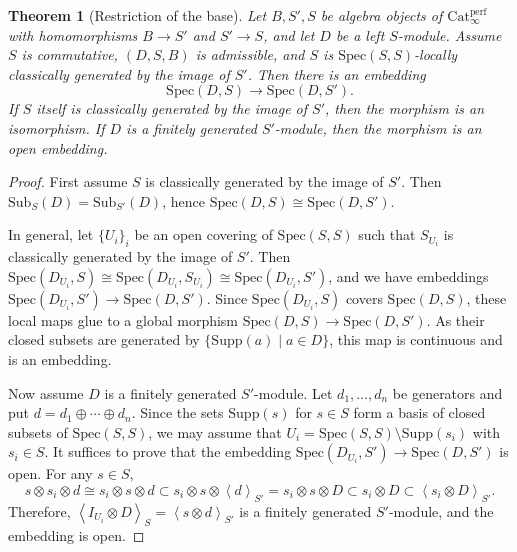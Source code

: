 \documentclass[11pt]{amsart}
\theoremstyle{definition}
\theoremstyle{plain}
\newtheorem{thm}[defn]{Theorem}
\theoremstyle{remark}
\newcommand{\Spec}{\mathrm{Spec}}
\newcommand{\Sub}{\mathrm{Sub}}
\newcommand{\Supp}{\mathrm{Supp}}
\newcommand{\Perf}{\mathrm{Cat}_{\infty}^{\mathrm{perf}}}
\newcommand{\ang}[1]{{\left\langle{#1}\right\rangle}}
\numberwithin{equation}{section}
\begin{document}
\begin{thm}[Restriction of the base]\label{thm:restriction_of_the_base}
Let \(B,S',S\) be algebra objects of \(\Perf\) with homomorphisms \(B\to S'\) and \(S'\to S\), and let \(D\) be a left \(S\)-module.
Assume \(S\) is commutative, \((D,S,B)\) is admissible, and \(S\) is \(\Spec(S,S)\)-locally classically generated by the image of \(S'\).
Then there is an embedding 
\[
\Spec(D,S)\to \Spec(D,S').
\]
If \(S\) itself is classically generated by the image of \(S'\), then the morphism is an isomorphism.
If \(D\) is a finitely generated \(S'\)-module, then the morphism is an open embedding.
\end{thm}
\begin{proof}
  First assume \(S\) is classically generated by the image of \(S'\).
  Then \(\Sub_S(D)=\Sub_{S'}(D)\), hence \(\Spec(D,S)\cong \Spec(D,S')\).

  In general, let \(\{U_i\}_i\) be an open covering of \(\Spec(S,S)\) such that \(S_{U_i}\) is classically generated by the image of \(S'\).
  Then
  \(\Spec(D_{U_i},S)\cong \Spec(D_{U_i},S_{U_i})\cong \Spec(D_{U_i},S')\),
  and we have embeddings \(\Spec(D_{U_i},S')\to \Spec(D,S')\).
  Since \(\Spec(D_{U_i},S)\) covers \(\Spec(D,S)\), these local maps glue to a global morphism \(\Spec(D,S)\to \Spec(D,S')\).
  As their closed subsets are generated by \(\{\Supp(a)\mid a\in D\}\), this map is continuous and is an embedding.

  Now assume \(D\) is a finitely generated \(S'\)-module.
  Let \(d_1,\ldots,d_n\) be generators and put \(d=d_1\oplus \cdots \oplus d_n\).
  Since the sets \(\Supp(s)\) for \(s\in S\) form a basis of closed subsets of \(\Spec(S,S)\), we may assume that \(U_i=\Spec(S,S)\setminus \Supp(s_i)\) with \(s_i\in S\).
  It suffices to prove that the embedding \(\Spec(D_{U_i},S')\to \Spec(D,S')\) is open.
  For any \(s\in S\),
  \[
  s\otimes s_i\otimes d
  \cong s_i\otimes s\otimes d
  \subset s_i\otimes s\otimes \ang{d}_{S'}
  =s_i\otimes s\otimes D
  \subset s_i\otimes D
  \subset \ang{s_i\otimes D}_{S'}.
  \]
  Therefore, \(\ang{I_{U_i}\otimes D}_{S}=\ang{s\otimes d}_{S'}\) is a finitely generated \(S'\)-module, and the embedding is open.
\end{proof}
\end{document}

